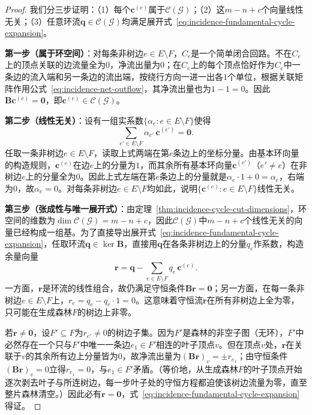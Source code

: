 \begin{proof}
我们分三步证明：（1）每个$\bm{c}^{(e)}$属于$\mathcal{C}(\mathcal{G})$；（2）这$m-n+c$个向量线性无关；（3）任意环流$\bm{q}\in\mathcal{C}(\mathcal{G})$均满足展开式~\eqref{eq:incidence-fundamental-cycle-expansion}。

\textbf{第一步（属于环空间）}：对每条非树边$e\in E\setminus F$，$C_e$是一个简单闭合回路。不在$C_e$上的顶点关联的边流量全为$0$，净流出量为$0$；在$C_e$上的每个顶点恰好作为$C_e$中一条边的流入端和另一条边的流出端，按绕行方向一进一出各$1$个单位，根据关联矩阵作用公式~\eqref{eq:incidence-net-outflow}，其净流出量也为$1-1=0$。因此$\bm{B}\bm{c}^{(e)}=\bm{0}$，即$\bm{c}^{(e)}\in\mathcal{C}(\mathcal{G})$。

\textbf{第二步（线性无关）}：设有一组实系数$\{\alpha_e:e\in E\setminus F\}$使得
\[
\sum_{e'\in E\setminus F}\alpha_{e'}\,\bm{c}^{(e')}=\bm{0}.
\]
任取一条非树边$e\in E\setminus F$，读取上式两端在第$e$条边上的坐标分量。由基本环向量的构造规则，$\bm{c}^{(e)}$在边$e$上的分量为$1$，而其余所有基本环向量$\bm{c}^{(e')}$（$e'\neq e$）在非树边$e$上的分量全为$0$。因此上式左端在第$e$条边上的分量就是$\alpha_e\cdot 1+0=\alpha_e$，右端为$0$，故$\alpha_e=0$。对每条非树边$e\in E\setminus F$均如此，说明$\{\bm{c}^{(e)}:e\in E\setminus F\}$线性无关。

\textbf{第三步（张成性与唯一展开式）}：由定理~\ref{thm:incidence-cycle-cut-dimensions}，环空间的维数为$\dim\mathcal{C}(\mathcal{G})=m-n+c$，因此$\mathcal{C}(\mathcal{G})$中$m-n+c$个线性无关的向量已经构成一组基。为了直接导出展开式~\eqref{eq:incidence-fundamental-cycle-expansion}，任取环流$\bm{q}\in\ker\bm{B}$，直接用$\bm{q}$在各条非树边上的分量$q_e$作系数，构造余量向量
\[
\bm{r}=\bm{q}-\sum_{e\in E\setminus F}q_e\,\bm{c}^{(e)}.
\]
一方面，$\bm{r}$是环流的线性组合，故仍满足守恒条件$\bm{B}\bm{r}=\bm{0}$；另一方面，在每一条非树边$e\in E\setminus F$上，$r_e=q_e-q_e\cdot 1=0$。这意味着守恒流$\bm{r}$在所有非树边上全为零，只可能在生成森林$F$的树边上非零。

若$\bm{r}\neq\bm{0}$，设$F'\subseteq F$为$r_{e'}\neq 0$的树边子集。因为$F'$是森林的非空子图（无环），$F'$中必然存在一个只与$F'$中唯一一条边$e_1\in F'$相连的叶子顶点$v$。但在顶点$v$处，$\bm{r}$在关联于$v$的其余所有边上分量皆为$0$，故净流出量为$(\bm{B}\bm{r})_v=\pm r_{e_1}$；由守恒条件$(\bm{B}\bm{r})_v=0$立得$r_{e_1}=0$，与$e_1\in F'$矛盾。（等价地，从生成森林$F$的叶子顶点开始逐次剥去叶子与所连树边，每一步叶子处的守恒方程都迫使该树边流量为零，直至整片森林清空。）因此必有$\bm{r}=\bm{0}$，式~\eqref{eq:incidence-fundamental-cycle-expansion}得证。
\end{proof}

